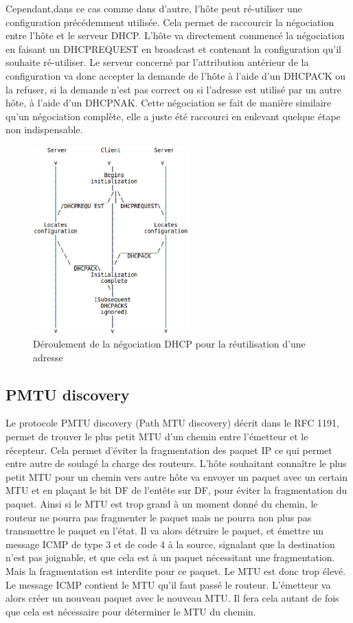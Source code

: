 Cependant,dans ce cas comme dans d'autre, l'hôte peut ré-utiliser une
configuration précédemment utilisée. Cela permet de raccourcir la négociation
entre l'hôte et le serveur DHCP. L'hôte va directement commencé la négociation
en faisant un DHCPREQUEST en broadcast et contenant la configuration qu'il
souhaite ré-utiliser. Le serveur concerné par l'attribution antérieur de la
configuration va donc accepter la demande de l'hôte à l'aide d'un DHCPACK ou la
refuser, si la demande n'est pas correct ou si l'adresse est utilisé par un
autre hôte, à l'aide d'un DHCPNAK.  Cette négociation se fait de manière
similaire qu'un négociation complète, elle a juste été raccourci en enlevant
quelque étape non indispensable.

\begin{figure}
\centering
\includegraphics[width=6cm]{./pics/timeline_dhcp_reuse_add.eps}
\caption{Déroulement de la négociation DHCP pour la réutilisation d'une adresse}
\label{fig:timelinedhcpreuseadd}
\end{figure}

\subsection{PMTU discovery}
Le protocole PMTU discovery (Path MTU discovery) décrit dans le RFC 1191\cite{url-RFC-PMTU}, permet de trouver le plus petit MTU d'un chemin entre l'émetteur et le récepteur. Cela permet d'éviter la fragmentation des paquet IP ce qui permet entre autre de soulagé la charge des routeurs.
L'hôte souhaitant connaître le plus petit MTU pour un chemin vers autre hôte va envoyer un paquet avec un certain MTU et en plaçant le bit DF de l'entête sur DF, pour éviter la fragmentation du paquet. Ainsi si le MTU est trop grand à un moment donné du chemin, le routeur ne pourra pas fragmenter le paquet mais ne pourra non plus pas transmettre le paquet en l'état. Il va alors détruire le paquet, et émettre un message ICMP de type 3 et de code 4 à la source, signalant que la destination n'est pas joignable, et que cela est à un paquet nécessitant une fragmentation. Mais la fragmentation est interdite pour ce paquet. Le MTU est donc trop élevé. Le message ICMP contient le MTU qu'il faut passé le routeur.
L'émetteur va alors créer un nouveau paquet avec le nouveau MTU. Il fera cela autant de fois que cela est nécessaire pour déterminer le MTU du chemin.

